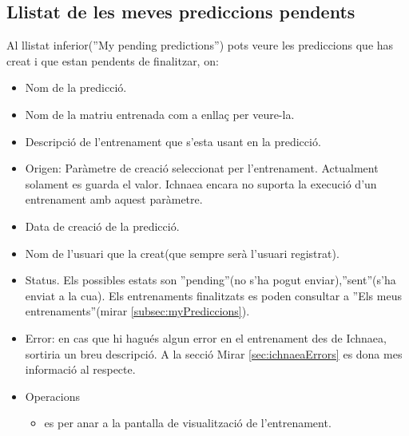 \subsection{Llistat de les meves prediccions pendents}
Al llistat inferior(''My pending predictions'') pots veure les prediccions que has creat i que estan pendents de finalitzar, on: 
\begin{itemize}
\item Nom de la predicció.
\item Nom de la matriu entrenada com a enllaç per veure-la.
\item Descripci\'{o} de l'entrenament que s'esta usant en la predicció.
\item Origen: Paràmetre de creació seleccionat per l'entrenament. Actualment solament es guarda el valor. Ichnaea encara no suporta la execució d'un entrenament amb aquest paràmetre.
\item Data de creaci\'{o} de la predicció.
\item Nom de l'usuari que la creat(que sempre serà l'usuari registrat).
\item Status. Els possibles estats son ''pending''(no s'ha pogut enviar),''sent''(s'ha enviat a la cua). Els entrenaments finalitzats es poden consultar a ''Els meus entrenaments''(mirar \ref{subsec:myPrediccions}).
\item Error: en cas que hi hagués algun error en el entrenament des de Ichnaea, sortiria un breu descripció. A la secció Mirar \ref{sec:ichnaeaErrors} es dona mes informació al respecte.
\item Operacions
 \begin{itemize}
 \item \iconeyeopen es per anar a la pantalla de visualització de l'entrenament.
 \end{itemize}
\end{itemize}


